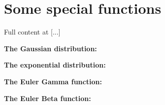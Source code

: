 \chapter{Some special functions}
\label{appendix4}

Full content at [...]

\medskip

\textbf{The Gaussian distribution:}

\medskip

\textbf{The exponential distribution:}

\medskip

\textbf{The Euler Gamma function:}

\medskip

\textbf{The Euler Beta function:}
